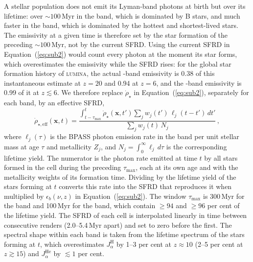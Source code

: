 \documentclass[apj,twocolumn, appendixfloats, twocolappendix, numberedappendix, tighten]{openjournal}
\DeclareRobustCommand{\lumina}{\mbox{\textsc{lumina}}\xspace}
\begin{document}
\begin{appendix}
A stellar population does not emit its Lyman-band photons at birth but over its lifetime: over $\sim 100$\,Myr in the  band, which is dominated by B stars, and much faster in the  band, which is dominated by the hottest and shortest-lived stars. The emissivity at a given time is therefore set by the star formation of the preceding $\sim 100$\,Myr, not by the current SFRD. Using the current SFRD in Equation~(\ref{eq:sub2}) would count every photon at the moment its star forms, which overestimates the emissivity while the SFRD rises: for the global star formation history of \lumina, the actual -band emissivity is 0.38 of this instantaneous estimate at $z = 20$ and 0.94 at $z = 6$, and the -band emissivity is 0.99 of it at $z \lesssim 6$. We therefore replace $\dot{\rho}_\star$ in Equation~(\ref{eq:sub2}), separately for each band, by an effective SFRD,
\begin{equation}
    \dot{\rho}_{\star,\mathrm{eff}}(\mathbf{x}, t) = \frac{\int_{t-\tau_\mathrm{max}}^{t} \dot{\rho}_\star(\mathbf{x}, t') \sum_j w_j(t')\, \ell_j(t-t')\, dt'}{\sum_j w_j(t)\, N_j}\,,
    \label{eq:sfr_eff}
\end{equation}
where $\ell_j(\tau)$ is the BPASS photon emission rate in the band per unit stellar mass at age $\tau$ and metallicity $Z_j$, and $N_j = \int_0^\infty \ell_j\, d\tau$ is the corresponding lifetime yield. The numerator is the photon rate emitted at time $t$ by all stars formed in the cell during the preceding $\tau_\mathrm{max}$, each at its own age and with the metallicity weights of its formation time. Dividing by the lifetime yield of the stars forming at $t$ converts this rate into the SFRD that reproduces it when multiplied by $\epsilon_b(\nu, z)$ in Equation~(\ref{eq:sub2}). The window $\tau_\mathrm{max}$ is 300\,Myr for the  band and 100\,Myr for the  band, which contain $\geq 94$ and $\geq 96$ per cent of the lifetime yield. The SFRD of each cell is interpolated linearly in time between consecutive renders (2.0--5.4\,Myr apart) and set to zero before the first. The spectral shape within each band is taken from the lifetime spectrum of the stars forming at $t$, which overestimates $J_\alpha^\mathrm{H}$ by 1--3 per cent at $z \approx 10$ (2--5 per cent at $z \gtrsim 15$) and $J_\alpha^\mathrm{He}$ by $\lesssim 1$ per cent.

\end{appendix}
\end{document}
